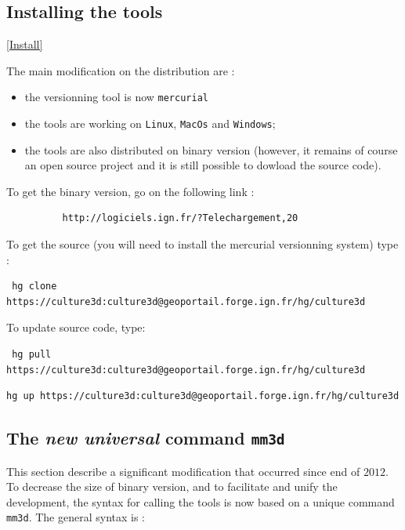\subsection{Installing the tools}
\ref{Install}

The main modification on the distribution are :

\begin{itemize}
   \item  the versionning tool is now {\tt mercurial}
   \item  the tools are working on {\tt Linux}, {\tt MacOs} and  {\tt Windows};
   \item  the tools are also distributed on binary  version (however, it  remains of course
          an open source project and it is still possible to dowload the source code).
\end{itemize}

To get the binary version, go on the following link :

\begin{verbatim}
          http://logiciels.ign.fr/?Telechargement,20
\end{verbatim}

To get the source (you will need to install the mercurial versionning system) type :

\begin{verbatim}
 hg clone https://culture3d:culture3d@geoportail.forge.ign.fr/hg/culture3d
\end{verbatim}

To update source code, type:
 
\begin{verbatim}
 hg pull https://culture3d:culture3d@geoportail.forge.ign.fr/hg/culture3d 
\end{verbatim}

\begin{verbatim}
hg up https://culture3d:culture3d@geoportail.forge.ign.fr/hg/culture3d 
\end{verbatim}

\subsection{The \emph{new universal} command {\tt mm3d}}

This section describe a significant modification that occurred since end of $2012$. To decrease the
size of binary version, and to facilitate and unify the development, the syntax for calling the tools is now
based on a unique command {\tt mm3d}. The general syntax is :

